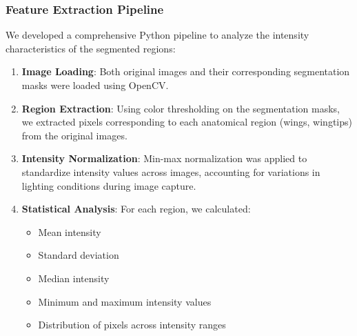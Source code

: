 \documentclass[a4paper,12pt]{report}
\begin{document}
\subsubsection{Feature Extraction Pipeline}
We developed a comprehensive Python pipeline to analyze the intensity characteristics of the segmented regions:

\begin{enumerate}
    \item \textbf{Image Loading}: Both original images and their corresponding segmentation masks were loaded using OpenCV.
    
    \item \textbf{Region Extraction}: Using color thresholding on the segmentation masks, we extracted pixels corresponding to each anatomical region (wings, wingtips) from the original images.
    
    \item \textbf{Intensity Normalization}: Min-max normalization was applied to standardize intensity values across images, accounting for variations in lighting conditions during image capture.
    
    \item \textbf{Statistical Analysis}: For each region, we calculated:
    \begin{itemize}
        \item Mean intensity
        \item Standard deviation
        \item Median intensity
        \item Minimum and maximum intensity values
        \item Distribution of pixels across intensity ranges
    \end{itemize}
\end{enumerate}
\end{document}
